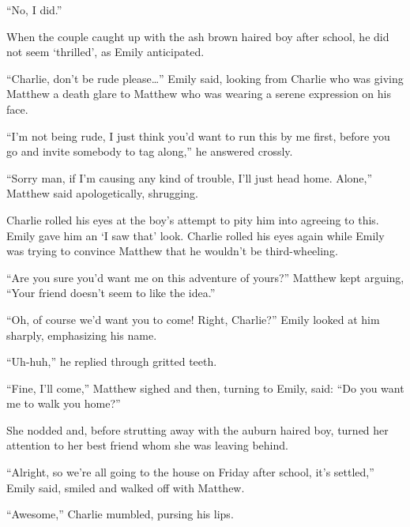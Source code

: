 “No, I did.”

When the couple caught up with the ash brown haired boy after school, he did not seem ‘thrilled’, as Emily anticipated.

“Charlie, don’t be rude please…” Emily said, looking from Charlie who was giving Matthew a death glare to Matthew who was wearing a serene expression on his face.

“I’m not being rude, I just think you’d want to run this by me first, before you go and invite somebody to tag along,” he answered crossly.

“Sorry man, if I’m causing any kind of trouble, I’ll just head home. Alone,” Matthew said apologetically, shrugging.

Charlie rolled his eyes at the boy’s attempt to pity him into agreeing to this. Emily gave him an ‘I saw that’ look. Charlie rolled his eyes again while Emily was trying to convince Matthew that he wouldn’t be third-wheeling.

“Are you sure you’d want me on this adventure of yours?” Matthew kept arguing, “Your friend doesn’t seem to like the idea.”

“Oh, of course we’d want you to come! Right, Charlie?” Emily looked at him sharply, emphasizing his name.

“Uh-huh,” he replied through gritted teeth.

“Fine, I’ll come,” Matthew sighed and then, turning to Emily, said: “Do you want me to walk you home?”

She nodded and, before strutting away with the auburn haired boy, turned her attention to her best friend whom she was leaving behind.

“Alright, so we’re all going to the house on Friday after school, it’s settled,” Emily said, smiled and walked off with Matthew.

“Awesome,” Charlie mumbled, pursing his lips.